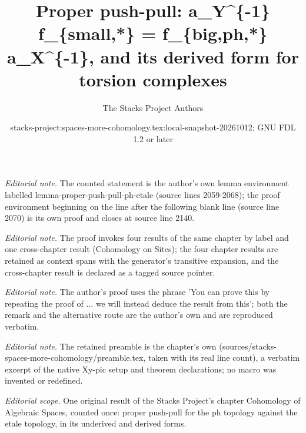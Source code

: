 \documentclass{stacks-project}
\title{Proper push-pull: a\_Y\textasciicircum{}\{-1\} f\_\{small,*\} = f\_\{big,ph,*\} a\_X\textasciicircum{}\{-1\}, and its derived form for torsion complexes}
\author{The Stacks Project Authors}
\date{stacks-project:spaces-more-cohomology.tex:local-snapshot-20261012; GNU FDL 1.2 or later}
\theoremstyle{plain}
\theoremstyle{definition}
\theoremstyle{remark}
\numberwithin{equation}{subsection}
\begin{document}
\maketitle
\noindent\textit{Editorial note.} The counted statement is the author's own lemma environment labelled lemma-proper-push-pull-ph-etale (source lines 2059-2068); the proof environment beginning on the line after the following blank line (source line 2070) is its own proof and closes at source line 2140.\par\medskip
\noindent\textit{Editorial note.} The proof invokes four results of the same chapter by label and one cross-chapter result (Cohomology on Sites); the four chapter results are retained as context spans with the generator's transitive expansion, and the cross-chapter result is declared as a tagged source pointer.\par\medskip
\noindent\textit{Editorial note.} The author's proof uses the phrase 'You can prove this by repeating the proof of ... we will instead deduce the result from this'; both the remark and the alternative route are the author's own and are reproduced verbatim.\par\medskip
\noindent\textit{Editorial note.} The retained preamble is the chapter's own (sources/stacks-spaces-more-cohomology/preamble.tex, taken with its real line count), a verbatim excerpt of the native Xy-pic setup and theorem declarations; no macro was invented or redefined.\par\medskip
\noindent\textit{Editorial scope.} One original result of the Stacks Project's chapter Cohomology of Algebraic Spaces, counted once: proper push-pull for the ph topology against the etale topology, in its underived and derived forms.\par\medskip
\end{document}
